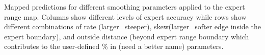Mapped predictions for different smoothing parameters applied to the expert range map. Columns show different levels of expert accuracy while rows show different combinations of rate (larger=steeper), skew(larger=softer edge inside the expert boundary), and outside distance (beyond expert range boundary which contributes to the user-defined \% in (need a better name) parameters. %
